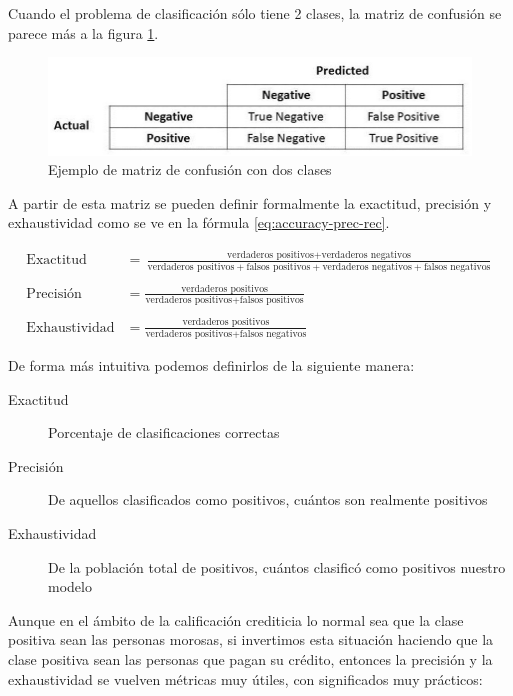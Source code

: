 Cuando el problema de clasificación sólo tiene 2 clases, la matriz de confusión se parece más a la figura \ref{fig:confussion2}.

\begin{figure}
    \centering
    \caption{Ejemplo de matriz de confusión con dos clases}
    \label{fig:confussion2}
    \includegraphics[width=0.8\linewidth]{graficos/confussion_matrix_2.png}
\end{figure}

A partir de esta matriz se pueden definir formalmente la exactitud, precisión y exhaustividad como se ve en la fórmula \ref{eq:accuracy-prec-rec}.

\begin{equation}
    \label{eq:accuracy-prec-rec}
\begin{split}
    \text{Exactitud}  &= \frac{\text{verdaderos positivos} + \text{verdaderos negativos}}{\text{verdaderos positivos} + \text{falsos positivos} + \text{verdaderos negativos} + \text{falsos negativos}} \\\\
    \text{Precisión} &= \frac{\text{verdaderos positivos}}{\text{verdaderos positivos} + \text{falsos positivos}} \\\\
    \text{Exhaustividad}    &= \frac{\text{verdaderos positivos}}{\text{verdaderos positivos} + \text{falsos negativos}} 
\end{split}
\end{equation}

De forma más intuitiva podemos definirlos de la siguiente manera:

\begin{description}
    \item [Exactitud] Porcentaje de clasificaciones correctas
    \item [Precisión] De aquellos clasificados como positivos, cuántos son realmente positivos
    \item [Exhaustividad] De la población total de positivos, cuántos clasificó como positivos nuestro modelo
\end{description}

Aunque en el ámbito de la calificación crediticia lo normal sea que la clase positiva sean las personas morosas, si invertimos esta situación haciendo que la clase positiva sean las personas que pagan su crédito, entonces la precisión y la exhaustividad se vuelven métricas muy útiles, con significados muy prácticos:


